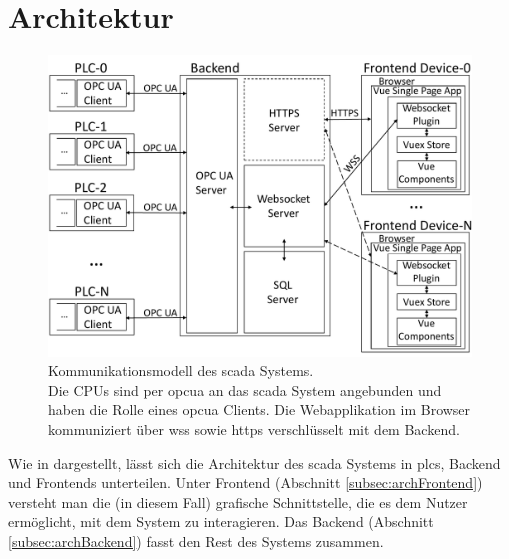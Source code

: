 \section{Architektur}\label{sec:arch}

\begin{figure}[ht]
		\centering
		\includegraphics[width=\textwidth]{content/hauptteil/systemEntwurf/res/comMod.pdf}
    \caption[Kommunikationsmodell des \acs{scada} Systems]{Kommunikationsmodell des \acs{scada} Systems.\\
      Die CPUs sind per \acs{opcua} an das \acs{scada} System angebunden und haben die Rolle eines \acs{opcua} Clients.
      Die Webapplikation im Browser kommuniziert über \acs{wss} sowie \acs{https} verschlüsselt mit dem Backend.}
		\label{img:comMod}
\end{figure}
Wie in  dargestellt, lässt sich die Architektur des \ac{scada} Systems in \acp{plc}, Backend und Frontends unterteilen.
Unter Frontend (Abschnitt \ref{subsec:archFrontend}) versteht man die (in diesem Fall) grafische Schnittstelle, 
die es dem Nutzer ermöglicht, mit dem System zu interagieren.
Das Backend (Abschnitt \ref{subsec:archBackend}) fasst den Rest des Systems zusammen.

